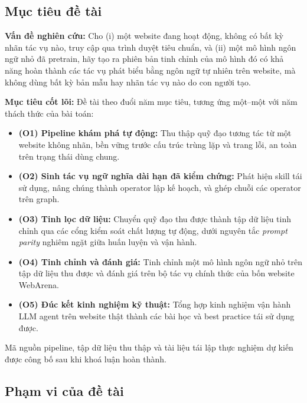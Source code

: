 \documentclass[14pt]{article}
\begin{document}
\subsection{Mục tiêu đề tài}

\textbf{Vấn đề nghiên cứu:} Cho (i) một website đang hoạt động, không có bất kỳ nhãn tác vụ nào, truy cập qua trình duyệt tiêu chuẩn, và (ii) một mô hình ngôn ngữ nhỏ đã pretrain, hãy tạo ra phiên bản tinh chỉnh của mô hình đó có khả năng hoàn thành các tác vụ phát biểu bằng ngôn ngữ tự nhiên trên website, mà không dùng bất kỳ bản mẫu hay nhãn tác vụ nào do con người tạo.

\textbf{Mục tiêu cốt lõi:} Đề tài theo đuổi năm mục tiêu, tương ứng một--một với năm thách thức của bài toán:

\begin{itemize}[leftmargin=1.5cm, label=\textbullet]
    \item \textbf{(O1) Pipeline khám phá tự động:} Thu thập quỹ đạo tương tác từ một website không nhãn, bền vững trước cấu trúc trùng lặp và trang lỗi, an toàn trên trạng thái dùng chung.

    \item \textbf{(O2) Sinh tác vụ ngữ nghĩa dài hạn đã kiểm chứng:} Phát hiện skill tái sử dụng, nâng chúng thành operator lập kế hoạch, và ghép chuỗi các operator trên graph.

    \item \textbf{(O3) Tinh lọc dữ liệu:} Chuyển quỹ đạo thu được thành tập dữ liệu tinh chỉnh qua các cổng kiểm soát chất lượng tự động, dưới nguyên tắc \textit{prompt parity} nghiêm ngặt giữa huấn luyện và vận hành.

    \item \textbf{(O4) Tinh chỉnh và đánh giá:} Tinh chỉnh một mô hình ngôn ngữ nhỏ trên tập dữ liệu thu được và đánh giá trên bộ tác vụ chính thức của bốn website WebArena.

    \item \textbf{(O5) Đúc kết kinh nghiệm kỹ thuật:} Tổng hợp kinh nghiệm vận hành LLM agent trên website thật thành các bài học và best practice tái sử dụng được.
\end{itemize}

Mã nguồn pipeline, tập dữ liệu thu thập và tài liệu tái lập thực nghiệm dự kiến được công bố sau khi khoá luận hoàn thành.

\subsection{Phạm vi của đề tài}
\end{document}
